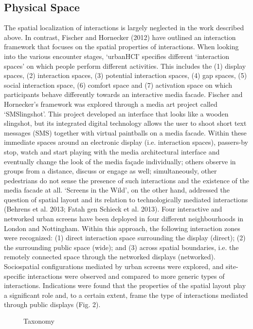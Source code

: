 \subsection* {Physical Space}
The spatial localization of interactions is largely neglected in the work described
above. In contrast, Fischer and Hornecker (2012) have outlined an interaction
framework that focuses on the spatial properties of interactions. When looking into
the various encounter stages, ‘urbanHCI’ specifies different ‘interaction spaces’
on which people perform different activities. This includes the (1) display spaces,
(2) interaction spaces, (3) potential interaction spaces, (4) gap spaces, (5) social
interaction space, (6) comfort space and (7) activation space on which participants
behave differently towards an interactive media facade. Fischer and Hornecker’s
framework was explored through a media art project called ‘SMSlingshot’. This
project developed an interface that looks like a wooden slingshot, but its integrated
digital technology allows the user to shoot short text messages (SMS) together
with virtual paintballs on a media facade. Within these immediate spaces around
an electronic display (i.e. interaction spaces), passers-by stop, watch and start
playing with the media architectural interface and eventually change the look of
the media façade individually; others observe in groups from a distance, discuss
or engage as well; simultaneously, other pedestrians do not sense the presence of
such interactions and the existence of the media facade at all.
‘Screens in the Wild’, on the other hand, addressed the question of spatial layout
and its relation to technologically mediated interactions (Behrens et al. 2013;
Fatah gen Schieck et al. 2013). Four interactive and networked urban screens
have been deployed in four different neighbourhoods in London and Nottingham.
Within this approach, the following interaction zones were recognized: (1) direct
interaction space surrounding the display (direct); (2) the surrounding public
space (wide); and (3) across spatial boundaries, i.e. the remotely connected space
through the networked displays (networked). Sociospatial configurations mediated by urban screens were explored, and site-specific interactions were observed and
compared to more generic types of interactions. Indications were found that the
properties of the spatial layout play a significant role and, to a certain extent,
frame the type of interactions mediated through public displays (Fig. 2).

\begin{figure}[htp]
\centering
\caption{Taxonomy}
\label{fig:taxonomy}
\end{figure}


